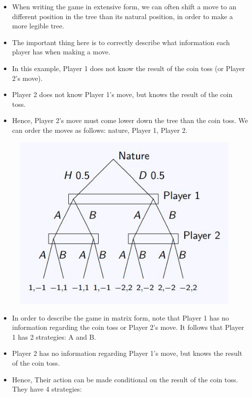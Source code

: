 \documentclass[]{report}
\begin{document}
\begin{itemize}
	\item When writing the game in extensive form, we can often shift a
	move to an different position in the tree than its natural position,
	in order to make a more legible tree.
	\item	The important thing here is to correctly describe what information
	each player has when making a move.
	\item In this example, Player 1 does not know the result of the coin toss
	(or Player 2’s move).
	\item	Player 2 does not know Player 1’s move, but knows the result of
	the coin toss. 
	\item Hence, Player 2’s move must come lower down the
	tree than the coin toss. We can order the moves as follows:
	nature, Player 1, Player 2.
\end{itemize}


\begin{figure}
\centering
\includegraphics[width=0.55\linewidth]{images/DR5-Slide25}
\caption{}
\label{fig:DR5-Slide25}
\end{figure}

\begin{itemize}
	\item In order to describe the game in matrix form, note that Player 1
	has no information regarding the coin toss or Player 2’s move. It
	follows that Player 1 has 2 strategies: A and B.
\item	Player 2 has no information regarding Player 1’s move, but knows
	the result of the coin toss. 
\item Hence, Their action can be made
	conditional on the result of the coin toss. They have 4 strategies:
\end{itemize}
\end{document}
